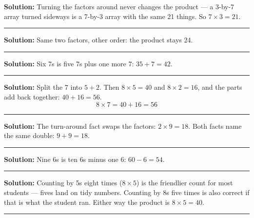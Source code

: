 \documentclass[12pt]{article}
\begin{document}



\textbf{Solution:} Turning the factors around never changes the product --- a 3-by-7 array turned sideways is a 7-by-3 array with the same 21 things. So $7 \times 3 = 21$. 

\noindent\rule{\linewidth}{0.2pt}


\textbf{Solution:} Same two factors, other order: the product stays 24. 

\noindent\rule{\linewidth}{0.2pt}


\textbf{Solution:} Six 7s is five 7s plus one more 7: $35 + 7 = 42$. 

\noindent\rule{\linewidth}{0.2pt}


\textbf{Solution:} Split the 7 into $5 + 2$. Then $8 \times 5 = 40$ and $8 \times 2 = 16$, and the parts add back together: $40 + 16 = 56$.
\[ \boxed{8 \times 7 = 40 + 16 = 56} \]

\noindent\rule{\linewidth}{0.2pt}


\textbf{Solution:} The turn-around fact swaps the factors: $2 \times 9 = 18$. Both facts name the same double: $9 + 9 = 18$. 

\noindent\rule{\linewidth}{0.2pt}


\textbf{Solution:} Nine 6s is ten 6s minus one 6: $60 - 6 = 54$. 

\noindent\rule{\linewidth}{0.2pt}


\textbf{Solution:} Counting by 5s eight times ($8 \times 5$) is the friendlier count for most students --- fives land on tidy numbers. Counting by 8s five times is also correct if that is what the student ran. Either way the product is $8 \times 5 = 40$. 

\noindent\rule{\linewidth}{0.2pt}
\end{document}
